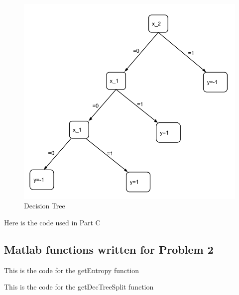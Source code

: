 \documentclass[twoside,11pt]{article}
\theoremstyle{definition}
\begin{document}
\begin{figure}[h]
\centering
\includegraphics[width=6 in]{hw4prob2DecisionTree.png}
\caption{Decision Tree}
\end{figure}

Here is the code used in Part C



\subsection*{Matlab functions written for Problem 2}

This is the code for the getEntropy function


This is the code for the getDecTreeSplit function

\end{document}

